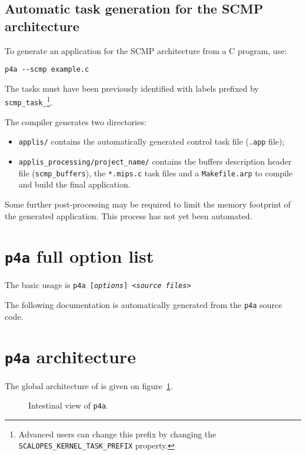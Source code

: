 \documentclass[a4paper]{article}
\begin{document}
\subsection{Automatic task generation for the SCMP architecture}
\label{sec:scmp}

To generate an application for the SCMP architecture from a C program, use:
\begin{verbatim}
p4a --scmp example.c
\end{verbatim}
The tasks must have been previously identified with labels prefixed by
\texttt{scmp\_task\_}\footnote{Advanced users can change this prefix
  by changing the \Apips \texttt{SCALOPES\_KERNEL\_TASK\_PREFIX}
  property.}.

The compiler generates two directories:
\begin{itemize}
\item \texttt{applis/}  contains the automatically generated control task file (\texttt{.app} file);
\item \texttt{applis\_processing/project\_name/} contains the buffers
  description header file (\texttt{scmp\_buffers}), the
  \texttt{*.mips.c} task files and a \texttt{Makefile.arp} to compile
  and build the final application.
\end{itemize}

Some further post-processing may be required to limit the memory
footprint of the generated application. This process has not yet been
automated.

\section{\protect\texttt{p4a} full option list}
\label{sec:options}

The basic usage is \texttt{p4a [\emph{options}] <\emph{source files}>}

The following documentation is automatically generated from the
\texttt{p4a} source code.




\section{\protect\texttt{p4a} architecture}
\label{sec:p4a-architecture}

The global architecture of \Apfa is given on
figure~\ref{fig:transit_intestinal}.

\begin{figure}
  \caption{Intestinal view of \texttt{p4a}.}
  \label{fig:transit_intestinal}
\end{figure}
\end{document}
